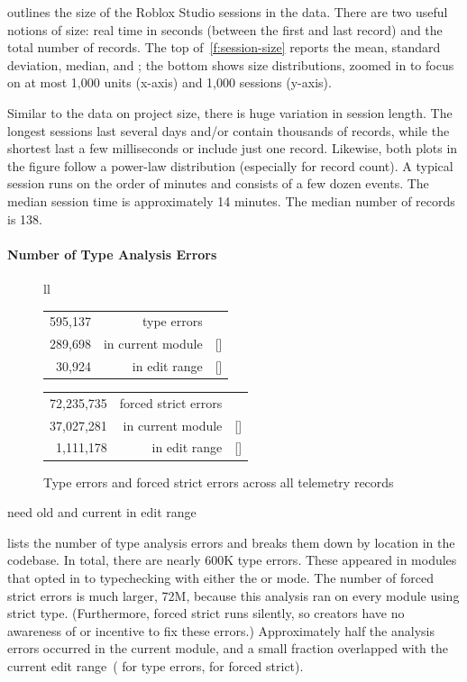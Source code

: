 \documentclass[english,submission,cleveref]{programming}
\begin{document}
 outlines the size of the Roblox Studio sessions in the
data.
There are two useful notions of size: real time in seconds (between the first
and last record) and the total number of records.
The top of~\cref{f:session-size} reports the mean, standard deviation,
median, and ; the bottom shows size distributions, zoomed in
to focus on at most 1,000 units (x-axis) and 1,000 sessions
(y-axis).

Similar to the data on project size, there is huge variation in session
length.
The longest sessions last several days and/or contain thousands of records,
while the shortest last a few milliseconds or include just one record.
Likewise, both plots in the figure follow a power-law distribution
(especially for record count).
A typical session runs on the order of minutes and consists of a few dozen events.
The median session time is approximately 14 minutes.
The median number of
records is 138.


\paragraph{Number of Type Analysis Errors}

\begin{figure}[t]
  \begin{tabular}[t]{ll} \\
    \begin{tabular}[t]{r@{~~}r@{~}l}
      595,137 & type errors \\
      289,698 & in current module & [\pct{48.68}] \\
       30,924 & in edit range & [\pct{5.20}]
    \end{tabular}
    \begin{tabular}[t]{r@{~~}r@{~}l}
      72,235,735 & {forced strict errors} \\
      37,027,281 & in current module & [\pct{51.26}] \\
       1,111,178 & in edit range & [\pct{1.54}]
    \end{tabular}
  \end{tabular}
  \caption{Type errors and forced strict errors across all telemetry records}
  \label{f:count-analysis-errors}
\end{figure}

\FILL{} need old and current in edit range

 lists the number of type analysis errors
and breaks them down by location in the codebase.
In total, there are nearly 600K type errors.
These appeared in modules that opted in to typechecking with either the
\mnonstrict{} or \mstrict{} mode.
The number of forced strict errors is much larger, 72M, because this analysis
ran on every module using strict type.
(Furthermore, forced strict runs silently, so creators have no
awareness of or incentive to
fix these errors.)
Approximately half the analysis errors occurred in the current module,
and a small fraction overlapped with the current edit range~( for
type errors,  for forced strict).
\end{document}
